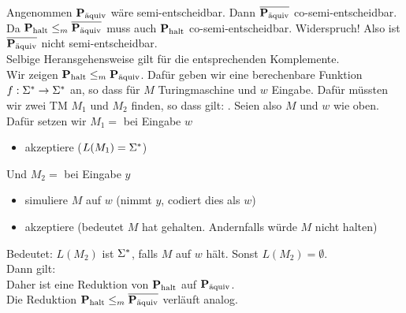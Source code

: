     \LOES Angenommen $\paq$ wäre semi-entscheidbar. Dann $\overline{\paq}$ co-semi-entscheidbar. \\ Da $\phalt \leq_{m} \overline{\paq}$ muss auch $\phalt$ co-semi-entscheidbar. Widerspruch! Also ist $\overline{\paq}$ nicht semi-entscheidbar. \\
    Selbige Heransgehensweise gilt für die entsprechenden Komplemente. \\

    Wir zeigen $\phalt \leq_{m} \paq$. Dafür geben wir eine berechenbare Funktion $f: \SIGS \to \SIGS$ an, so dass  für $M$ Turingmaschine und $w$ Eingabe.
    Dafür müssten wir zwei TM $M_{1}$ und $M_{2}$ finden, so dass gilt: .
    Seien also $M$ und $w$ wie oben. \\

    Dafür setzen wir $M_{1} =$ bei Eingabe $w$
    \begin{itemize}
        \item akzeptiere ($L(M_{1}) = \SIGS$)
    \end{itemize}
    Und $M_{2} = $ bei Eingabe $y$
    \begin{itemize}
        \item simuliere $M$ auf $w$ (nimmt $y$, codiert dies als $w$)
        \item akzeptiere (bedeutet $M$ hat gehalten. Andernfalls würde $M$ nicht halten)
    \end{itemize}
    Bedeutet: $L(M_{2})$ ist $\SIGS$, falls $M$ auf $w$ hält. Sonst $L(M_{2}) = \emptyset$. \\
    Dann gilt:  \\
    Daher ist  eine Reduktion von $\phalt$ auf $\paq$. \\
    Die Reduktion $\phalt \leq_{m} \overline{\paq}$ verläuft analog.

